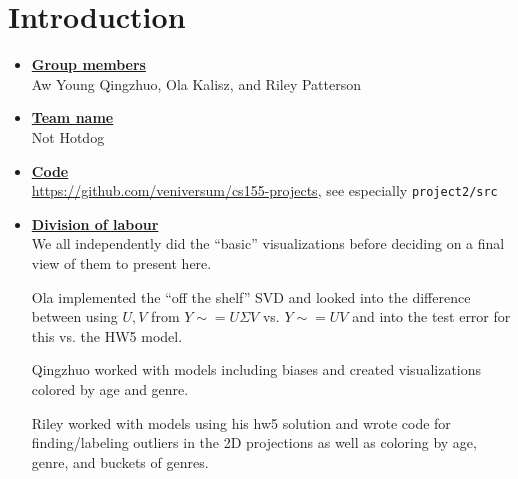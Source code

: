 
\newcommand{\boldline}[1]{\underline{\textbf{#1}}}



\pagestyle{fancy}

\section{Introduction}
\medskip
\begin{itemize}

    \item \boldline{Group members} \\
    Aw Young Qingzhuo, Ola Kalisz, and Riley Patterson

    \item \boldline{Team name} \\
    Not Hotdog

    \item \boldline{Code} \\
    \url{https://github.com/veniversum/cs155-projects}, see especially \texttt{project2/src}

    \item \boldline{Division of labour} \\
    We all independently did the ``basic'' visualizations before deciding on a final view of them to present here.

    Ola implemented the ``off the shelf'' SVD and looked into the difference between using $U,V$ from $Y \sim = U\Sigma V$ vs. $Y \sim = UV$ and into the test error for this vs. the HW5 model.

    Qingzhuo worked with models including biases and created visualizations colored by age and genre.

    Riley worked with models using his hw5 solution and wrote code for finding/labeling outliers in the 2D projections as well as coloring by age, genre, and buckets of genres.

\end{itemize}



